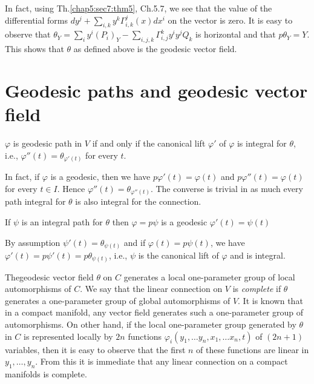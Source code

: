 In fact, using Th.\ref{chap5:sec7:thm5}, Ch.5.7, we see that the value of the
differential forms $dy^j + \sum \limits_{i, k} y^k
\Gamma^j_{i,k}(x)dx^i$ on the vector is zero. It is easy to observe
that $\theta_Y = \sum\limits_{i} y^i (P_i)_Y - \sum\limits_{i,j,k}
\Gamma^k_{i,j} y^i y^j Q_k$ is horizontal and that $p \theta_Y =
Y$. This shows that $\theta$ as defined above is the geodesic vector
field.	 

\section{Geodesic paths and geodesic vector field}\label{chap5:sec12}%

\begin{proposition}\label{chap5:sec12:prop4}%
  $\varphi$ is geodesic path in $V$ if and only if the canonical lift
  $\varphi'$ of $\varphi$ is integral for $\theta$, i.e.,
  $\varphi''(t) = \theta_{\varphi'(t)}$ for every $t$. 
\end{proposition}

In fact, if $\varphi$ is a geodesic, then we have $p\varphi'(t) =
\varphi(t)$ and $p\varphi''(t) = \varphi(t)$ for every $t \in
I$. Hence $\varphi ''(t) = \theta_{\varphi''(t)}$. The converse is
trivial in as much every path integral for $\theta$ is also integral
for the connection. 

\begin{proposition}\label{chap5:sec12:prop5}%
  If $\psi$ is an integral path for $\theta$ then $\varphi =p\psi$
  is a geodesic $\varphi'(t) = \psi(t)$ 
\end{proposition}

By assumption $\psi'(t) = \theta_{\psi(t)}$ and if $\varphi(t) = p
\psi(t)$, we have $\varphi'(t) = p \psi'(t) = p \theta_{\psi(t)}$,
i.e., $\psi$ is the canonical lift of $\varphi$ and is integral. 

The\pageoriginale geodesic vector field $\theta$ on $C$ generates a local
one-parameter group of local automorphisms of $C$. We say that the
linear connection on $V$ is \textit{complete} if $\theta$ generates a
one-parameter group of global automorphisms of $V$. It is known that
in a compact manifold, any vector field generates such a one-parameter
group of automorphisms. On other hand, if the local one-parameter
group generated by $\theta$ in $C$ is represented locally by $2 n$
functions $\varphi_i (y_1 , \ldots y_n , x_1 , \ldots x_n, t)$ of
$(2n+1)$ variables, then it is easy to observe that the first $n$ of
these functions are linear in $y_1 , \ldots , y_n$. From this it is
immediate that any linear connection on a compact manifolds is
complete. 


